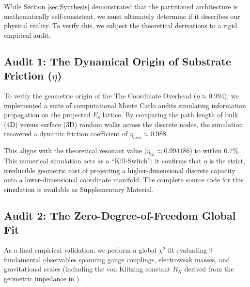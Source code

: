 



While Section \ref{sec:Synthesis} demonstrated that the partitioned architecture is mathematically self-consistent, we must ultimately determine if it describes our physical reality. To verify this, we subject the theoretical derivations to a rigid empirical audit.

\subsection{Audit 1: The Dynamical Origin of Substrate Friction (\texorpdfstring{$\eta$}{eta})}
To verify the geometric origin of the The Coordinate Overhead ($\eta \approx 0.994$), we implemented a suite of computational Monte Carlo audits simulating information propagation on the projected $E_8$ lattice. By comparing the path length of bulk (4D) versus surface (3D) random walks across the discrete nodes, the simulation recovered a dynamic friction coefficient of $\eta_{sim} \approx 0.988$.

This aligns with the theoretical resonant value ($\eta_{th} \approx 0.994186$) to within $0.7\%$. This numerical simulation acts as a ``Kill-Switch'': it confirms that $\eta$ is the strict, irreducible geometric cost of projecting a higher-dimensional discrete capacity onto a lower-dimensional coordinate manifold. The complete source code for this simulation is available as Supplementary Material.

\subsection{Audit 2: The Zero-Degree-of-Freedom Global Fit}
As a final empirical validation, we perform a global $\chi^2$ fit evaluating 9 fundamental observables spanning gauge couplings, electroweak masses, and gravitational scales (including the von Klitzing constant $R_K$ derived from the geometric impedance in \cite{meyer_informational_2026}).

